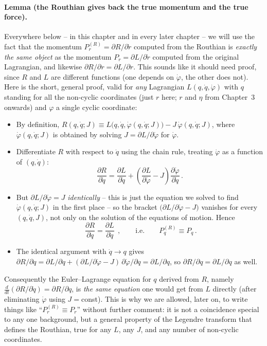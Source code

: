 \documentclass[11pt]{article}
\begin{document}
\paragraph{Lemma (the Routhian gives back the true momentum and the true force).}
\label{lemma:routh}
Everywhere below -- in this chapter and in every later chapter -- we will use the fact that the momentum $P_r^{(R)}=\partial R/\partial\dot r$ computed from the Routhian is \emph{exactly the same object} as the momentum $P_r=\partial L/\partial\dot r$ computed from the original Lagrangian, and likewise $\partial R/\partial r=\partial L/\partial r$. This sounds like it should need proof, since $R$ and $L$ are different functions (one depends on $\dot\varphi$, the other does not). Here is the short, general proof, valid for \emph{any} Lagrangian $L(q,\dot q,\dot\varphi)$ with $q$ standing for all the non-cyclic coordinates (just $r$ here; $r$ and $\eta$ from Chapter~3 onwards) and $\varphi$ a single cyclic coordinate:
\begin{itemize}
\item By definition, $R(q,\dot q;J)\equiv L\big(q,\dot q,\dot\varphi(q,\dot q;J)\big)-J\,\dot\varphi(q,\dot q;J)$, where $\dot\varphi(q,\dot q;J)$ is obtained by solving $J=\partial L/\partial\dot\varphi$ for $\dot\varphi$.
\item Differentiate $R$ with respect to $\dot q$ using the chain rule, treating $\dot\varphi$ as a function of $(q,\dot q)$:
\begin{equation}
\frac{\partial R}{\partial \dot q}
=
\frac{\partial L}{\partial \dot q}
+
\left(\frac{\partial L}{\partial \dot\varphi}-J\right)\frac{\partial \dot\varphi}{\partial \dot q}\,.
\end{equation}
\item But $\partial L/\partial\dot\varphi=J$ \emph{identically} -- this is just the equation we solved to find $\dot\varphi(q,\dot q;J)$ in the first place -- so the bracket $\big(\partial L/\partial\dot\varphi-J\big)$ vanishes for every $(q,\dot q,J)$, not only on the solution of the equations of motion. Hence
\begin{equation}
\boxed{\;\frac{\partial R}{\partial \dot q}=\frac{\partial L}{\partial \dot q}\;}\,,
\qquad\text{i.e.}\qquad P_q^{(R)}\equiv P_q\,.
\end{equation}
\item The identical argument with $\dot q\to q$ gives $\partial R/\partial q=\partial L/\partial q+(\partial L/\partial\dot\varphi-J)\,\partial\dot\varphi/\partial q=\partial L/\partial q$, so $\boxed{\partial R/\partial q=\partial L/\partial q}$ as well.
\end{itemize}
Consequently the Euler--Lagrange equation for $q$ derived from $R$, namely $\frac{d}{dt}(\partial R/\partial\dot q)=\partial R/\partial q$, is \emph{the same equation} one would get from $L$ directly (after eliminating $\dot\varphi$ using $J=$const). This is why we are allowed, later on, to write things like ``$P_r^{(R)}\equiv P_r$'' without further comment: it is not a coincidence special to any one background, but a general property of the Legendre transform that defines the Routhian, true for any $L$, any $J$, and any number of non-cyclic coordinates.
\end{document}

